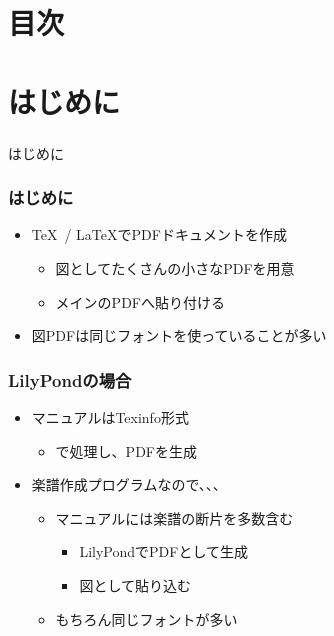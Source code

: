 \documentclass[unicode,17pt]{beamer}
\begin{document}

\section*{目次}
\begin{frame}\frametitle{}\small\setlength{\columnseprule}{1pt}
  \begin{multicols}{2}%
    \tableofcontents
  \end{multicols}
\end{frame}

\section{はじめに}
\begin{frame}\frametitle{}
  \centering
  はじめに
\end{frame}

\begin{frame}\frametitle{はじめに}
  \begin{itemize}
  \item \TeX ~/ \LaTeX でPDFドキュメントを作成
    \begin{itemize}
    \item 図としてたくさんの小さなPDFを用意
    \item メインのPDFへ貼り付ける
    \end{itemize}
  \item 図PDFは同じフォントを使っていることが多い
  \end{itemize}
\end{frame}

\begin{frame}\frametitle{LilyPondの場合}
  \begin{itemize}
  \item マニュアルはTexinfo形式
    \begin{itemize}
    \item {}で処理し、PDFを生成
    \end{itemize}
  \item 楽譜作成プログラムなので、、、
    \begin{itemize}
    \item マニュアルには楽譜の断片を多数含む
      \begin{itemize}
      \item LilyPondでPDFとして生成
      \item 図として貼り込む
      \end{itemize}
    \item もちろん同じフォントが多い
    \end{itemize}
  \end{itemize}
\end{frame}
\end{document}
